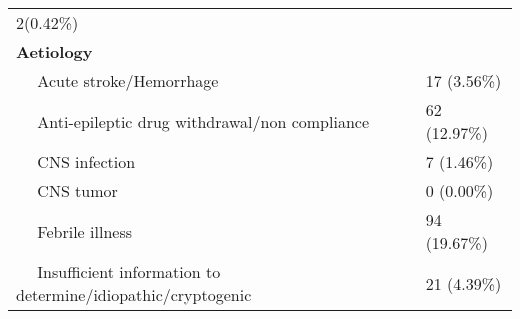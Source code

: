 \documentclass[
]{article}
\begin{document}
\begin{longtable}[]{@{}ll@{}}
\begin{minipage}[t]{0.21\columnwidth}
2(0.42\%)\strut
\end{minipage}\tabularnewline
\begin{minipage}[t]{0.73\columnwidth}\raggedright
\textbf{Aetiology}\strut
\end{minipage} & \begin{minipage}[t]{0.21\columnwidth}\raggedright
~~\strut
\end{minipage}\tabularnewline
\begin{minipage}[t]{0.73\columnwidth}\raggedright
~~ Acute stroke/Hemorrhage\strut
\end{minipage} & \begin{minipage}[t]{0.21\columnwidth}\raggedright
17 (3.56\%)\strut
\end{minipage}\tabularnewline
\begin{minipage}[t]{0.73\columnwidth}\raggedright
~~ Anti-epileptic drug withdrawal/non compliance\strut
\end{minipage} & \begin{minipage}[t]{0.21\columnwidth}\raggedright
62 (12.97\%)\strut
\end{minipage}\tabularnewline
\begin{minipage}[t]{0.73\columnwidth}\raggedright
~~ CNS infection\strut
\end{minipage} & \begin{minipage}[t]{0.21\columnwidth}\raggedright
7 (1.46\%)\strut
\end{minipage}\tabularnewline
\begin{minipage}[t]{0.73\columnwidth}\raggedright
~~ CNS tumor\strut
\end{minipage} & \begin{minipage}[t]{0.21\columnwidth}\raggedright
0 (0.00\%)\strut
\end{minipage}\tabularnewline
\begin{minipage}[t]{0.73\columnwidth}\raggedright
~~ Febrile illness\strut
\end{minipage} & \begin{minipage}[t]{0.21\columnwidth}\raggedright
94 (19.67\%)\strut
\end{minipage}\tabularnewline
\begin{minipage}[t]{0.73\columnwidth}\raggedright
~~ Insufficient information to determine/idiopathic/cryptogenic\strut
\end{minipage} & \begin{minipage}[t]{0.21\columnwidth}\raggedright
21 (4.39\%)\strut
\end{minipage}\tabularnewline

\end{longtable}
\end{document}
